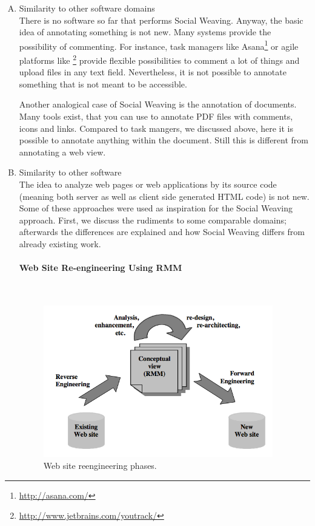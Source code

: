 \begin{enumerate}[A.]
\item Similarity to other software domains\\
There is no software so far that performs Social Weaving. Anyway, the basic idea of annotating something is not new. Many systems provide the possibility of commenting. For instance, task managers like Asana\footnote{\url{http://asana.com/}} or agile platforms like \footnote{\url{http://www.jetbrains.com/youtrack/}} provide flexible possibilities to comment a lot of things and upload files in any text field. Nevertheless, it is not possible to annotate something that is not meant to be accessible. 

Another analogical case of Social Weaving is the annotation of documents. Many tools exist, that you can use to annotate PDF files with comments, icons and links. Compared to task mangers, we discussed above, here it is possible to annotate anything within the document. Still this is different from annotating a web view. 

\item Similarity to other software\\
The idea to analyze web pages or web applications by its source code (meaning both server as well as client side generated HTML code) is not new. Some of these approaches were used as inspiration for the Social Weaving approach. 
First, we discuss the rudiments to some comparable domains; afterwards the differences are explained and how Social Weaving differs from already existing work.
	\paragraph{Web Site Re-engineering Using RMM}\mbox{}\\
	
	\begin{figure}\centering
			\includegraphics[width=10cm]{images/rmm-phases.png}
			\caption{Web site reengineering phases. \cite{antoniol2000web}}
			\label{rmm-phases}
	\end{figure} 
	

\end{enumerate}
